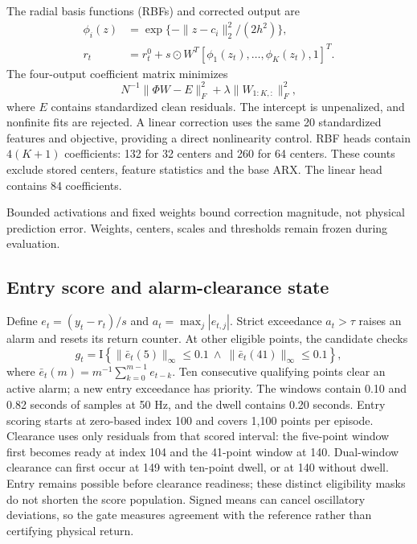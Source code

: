 The radial basis functions (RBFs) and corrected output are
\begin{align}
 \phi_i(z)&=\exp\{-\|z-c_i\|_2^2/(2h^2)\},\\
 r_t&=r_t^0+s\odot W^T[\phi_1(z_t),\ldots,\phi_K(z_t),1]^T.\label{eq:rbf}
\end{align}
The four-output coefficient matrix minimizes
\begin{equation}
 N^{-1}\|\Phi W-E\|_F^2+\lambda\|W_{1:K,:}\|_F^2,\label{eq:fit}
\end{equation}
where $E$ contains standardized clean residuals. The intercept is unpenalized, and nonfinite fits are rejected. A linear correction uses the same 20 standardized features and objective, providing a direct nonlinearity control. RBF heads contain $4(K+1)$ coefficients: 132 for 32 centers and 260 for 64 centers. These counts exclude stored centers, feature statistics and the base ARX. The linear head contains 84 coefficients.

Bounded activations and fixed weights bound correction magnitude, not physical prediction error. Weights, centers, scales and thresholds remain frozen during evaluation.

\subsection{Entry score and alarm-clearance state}
Define $e_t=(y_t-r_t)/s$ and $a_t=\max_j|e_{t,j}|$. Strict exceedance $a_t>\tau$ raises an alarm and resets its return counter. At other eligible points, the candidate checks
\begin{equation}
 g_t=\mathrm I\!\left\{\|\bar e_t(5)\|_\infty\le0.1\ \land\
 \|\bar e_t(41)\|_\infty\le0.1\right\},\label{eq:gate}
\end{equation}
where $\bar e_t(m)=m^{-1}\sum_{k=0}^{m-1}e_{t-k}$. Ten consecutive qualifying points clear an active alarm; a new entry exceedance has priority. The windows contain 0.10 and 0.82 seconds of samples at 50 Hz, and the dwell contains 0.20 seconds. Entry scoring starts at zero-based index 100 and covers 1,100 points per episode. Clearance uses only residuals from that scored interval: the five-point window first becomes ready at index 104 and the 41-point window at 140. Dual-window clearance can first occur at 149 with ten-point dwell, or at 140 without dwell. Entry remains possible before clearance readiness; these distinct eligibility masks do not shorten the score population. Signed means can cancel oscillatory deviations, so the gate measures agreement with the reference rather than certifying physical return.

